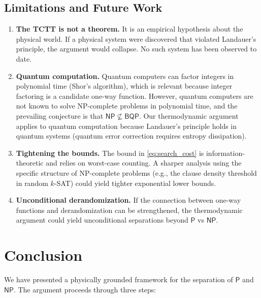 \documentclass[12pt, a4paper]{article}
\theoremstyle{plain}
\theoremstyle{definition}
\theoremstyle{remark}
\newcommand{\Pc}{\mathsf{P}}
\newcommand{\NPc}{\mathsf{NP}}
\begin{document}
\subsection{Limitations and Future Work}

\begin{enumerate}
  \item \textbf{The TCTT is not a theorem.} It is an empirical hypothesis
    about the physical world. If a physical system were discovered that
    violated Landauer's principle, the argument would collapse. No such
    system has been observed to date.

  \item \textbf{Quantum computation.} Quantum computers can factor integers
    in polynomial time (Shor's algorithm), which is relevant because
    integer factoring is a candidate one-way function. However, quantum
    computers are not known to solve NP-complete problems in polynomial
    time, and the prevailing conjecture is that $\NPc \not\subseteq
    \mathsf{BQP}$. Our thermodynamic argument applies to quantum
    computation because Landauer's principle holds in quantum systems
    (quantum error correction requires entropy dissipation).

  \item \textbf{Tightening the bounds.} The bound in
    \eqref{eq:search_cost} is information-theoretic and relies on
    worst-case counting. A sharper analysis using the specific structure
    of NP-complete problems (e.g., the clause density threshold in random
    $k$-SAT) could yield tighter exponential lower bounds.

  \item \textbf{Unconditional derandomization.} If the connection
    between one-way functions and derandomization
    \citep{ImpagliazzoWigderson1997} can be strengthened, the
    thermodynamic argument could yield unconditional separations beyond
    $\Pc$ vs $\NPc$.
\end{enumerate}

\section{Conclusion}\label{sec:conclusion}

We have presented a physically grounded framework for the separation of
$\Pc$ and $\NPc$. The argument proceeds through three steps:
\end{document}
